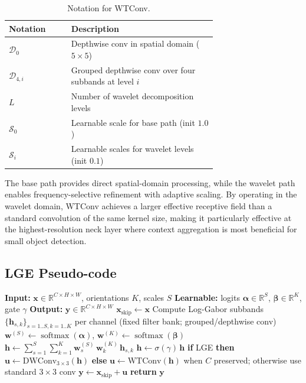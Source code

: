 \documentclass{article}
\theoremstyle{plain}
\theoremstyle{definition}
\theoremstyle{remark}
\begin{document}
\begin{table}[h]
\centering
\caption{Notation for WTConv.}
\label{tab:wtconv_notation}
\begin{tabular}{@{}l>{\raggedright\arraybackslash}p{0.70\linewidth}@{}}
 \toprule
 \cellcolor{blue!5}\textbf{Notation} & \cellcolor{blue!5}\textbf{Description} \\
 \midrule
 $\mathcal{D}_0$ & Depthwise conv in spatial domain ($5{\times}5$) \\
 $\mathcal{D}_{4,i}$ & Grouped depthwise conv over four subbands at level $i$ \\
 $L$ & Number of wavelet decomposition levels \\
 $\mathcal{S}_0$ & Learnable scale for base path (init $1.0$) \\
$\mathcal{S}_i$ & Learnable scales for wavelet levels (init $0.1$) \\
\bottomrule
\end{tabular}
\end{table}
The base path provides direct spatial-domain processing, while the wavelet path enables frequency-selective refinement with adaptive scaling. By operating in the wavelet domain, WTConv achieves a larger effective receptive field than a standard convolution of the same kernel size, making it particularly effective at the highest-resolution neck layer where context aggregation is most beneficial for small object detection.

\subsection{LGE Pseudo-code}

 \begin{algorithm}[H]
 \caption{LGE / LGE-W forward pass (Log-Gabor Enhancer and WTConv variant).}
 \label{alg:lge}
 \scriptsize
\begin{algorithmic}
   \STATE \textbf{Input:} $\mathbf{x}\in\mathbb{R}^{C\times H\times W}$, orientations $K$, scales $S$
   \STATE \textbf{Learnable:} logits $\boldsymbol{\alpha}\in\mathbb{R}^{S}$, $\boldsymbol{\beta}\in\mathbb{R}^{K}$, gate $\gamma$
   \STATE \textbf{Output:} $\mathbf{y}\in\mathbb{R}^{C\times H\times W}$
   \STATE $\mathbf{x}_{\mathrm{skip}} \leftarrow \mathbf{x}$ 
   \STATE Compute Log-Gabor subbands $\{\mathbf{h}_{s,k}\}_{s=1..S,k=1..K}$ per channel (fixed filter bank; grouped/depthwise conv)
   \STATE $\mathbf{w}^{(S)}\leftarrow\operatorname{softmax}(\boldsymbol{\alpha})$, $\mathbf{w}^{(K)}\leftarrow\operatorname{softmax}(\boldsymbol{\beta})$
   \STATE $\mathbf{h} \leftarrow \sum_{s=1}^{S}\sum_{k=1}^{K} \mathbf{w}^{(S)}_s\,\mathbf{w}^{(K)}_k\,\mathbf{h}_{s,k}$
   \STATE $\mathbf{h} \leftarrow \sigma(\gamma)\,\mathbf{h}$ 
   \STATE \textbf{if} LGE \textbf{then} $\mathbf{u} \leftarrow \mathrm{DWConv}_{3\times3}(\mathbf{h})$
   \STATE \textbf{else}  $\mathbf{u} \leftarrow \mathrm{WTConv}(\mathbf{h})$ when $C$ preserved; otherwise use standard $3\times3$ conv
   \STATE $\mathbf{y} \leftarrow \mathbf{x}_{\mathrm{skip}} + \mathbf{u}$
   \STATE \textbf{return} $\mathbf{y}$
 \end{algorithmic}
 \end{algorithm}
\end{document}
